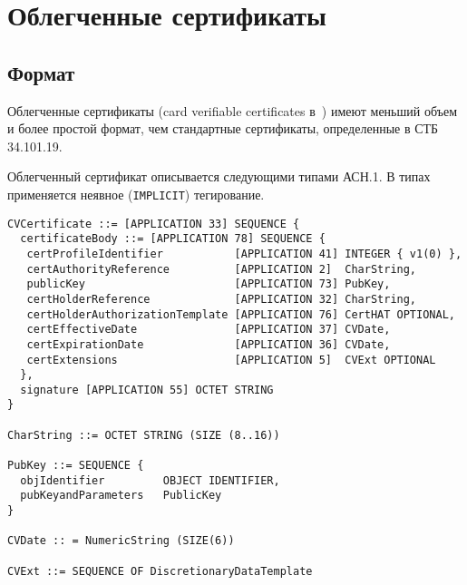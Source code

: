 \chapter{Облегченные сертификаты}\label{CERTS}

\section{Формат}\label{CERTS.Format}

Облегченные сертификаты (card verifiable certificates в~\cite{LightCerts}) 
имеют меньший объем и более простой формат, чем стандартные сертификаты,
определенные в СТБ 34.101.19.

Облегченный сертификат описывается следующими типами АСН.1.
В типах применяется неявное (\verb|IMPLICIT|) тегирование. 

\begin{verbatim}
CVCertificate ::= [APPLICATION 33] SEQUENCE {
  certificateBody ::= [APPLICATION 78] SEQUENCE {
   certProfileIdentifier           [APPLICATION 41] INTEGER { v1(0) },
   certAuthorityReference          [APPLICATION 2]  CharString,
   publicKey                       [APPLICATION 73] PubKey,
   certHolderReference             [APPLICATION 32] CharString,
   certHolderAuthorizationTemplate [APPLICATION 76] CertHAT OPTIONAL,
   certEffectiveDate               [APPLICATION 37] CVDate,
   certExpirationDate              [APPLICATION 36] CVDate,
   certExtensions                  [APPLICATION 5]  CVExt OPTIONAL 
  },
  signature [APPLICATION 55] OCTET STRING
}

CharString ::= OCTET STRING (SIZE (8..16))

PubKey ::= SEQUENCE {
  objIdentifier         OBJECT IDENTIFIER,
  pubKeyandParameters   PublicKey
}

CVDate :: = NumericString (SIZE(6))

CVExt ::= SEQUENCE OF DiscretionaryDataTemplate
\end{verbatim}

